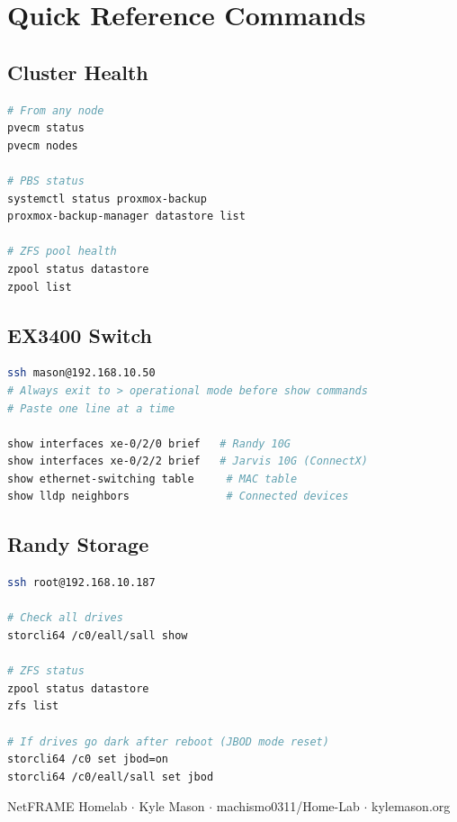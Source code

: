 \documentclass[11pt,letterpaper]{article}
\begin{document}
\section{Quick Reference Commands}

\subsection{Cluster Health}

\begin{lstlisting}[language=bash]
# From any node
pvecm status
pvecm nodes

# PBS status
systemctl status proxmox-backup
proxmox-backup-manager datastore list

# ZFS pool health
zpool status datastore
zpool list
\end{lstlisting}

\subsection{EX3400 Switch}

\begin{lstlisting}[language=bash]
ssh mason@192.168.10.50
# Always exit to > operational mode before show commands
# Paste one line at a time

show interfaces xe-0/2/0 brief   # Randy 10G
show interfaces xe-0/2/2 brief   # Jarvis 10G (ConnectX)
show ethernet-switching table     # MAC table
show lldp neighbors               # Connected devices
\end{lstlisting}

\subsection{Randy Storage}

\begin{lstlisting}[language=bash]
ssh root@192.168.10.187

# Check all drives
storcli64 /c0/eall/sall show

# ZFS status
zpool status datastore
zfs list

# If drives go dark after reboot (JBOD mode reset)
storcli64 /c0 set jbod=on
storcli64 /c0/eall/sall set jbod
\end{lstlisting}

\vfill
\begin{center}
\small\color{cmtgray}
NetFRAME Homelab $\cdot$ Kyle Mason $\cdot$ machismo0311/Home-Lab $\cdot$ kylemason.org
\end{center}
\end{document}
